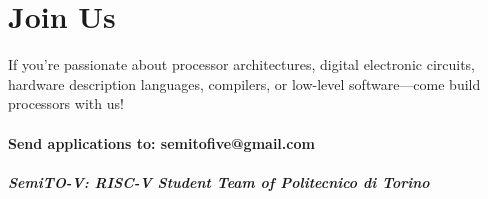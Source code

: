 \documentclass{article}
\begin{document}
\section{Join Us}

If you're passionate about processor architectures, digital electronic circuits, hardware description languages, compilers, or low-level software—come build processors with us!

\paragraph{Send applications to: semitofive@gmail.com}

\subparagraph{\textit{SemiTO-V: RISC-V Student Team of Politecnico di Torino}}
\end{document}
